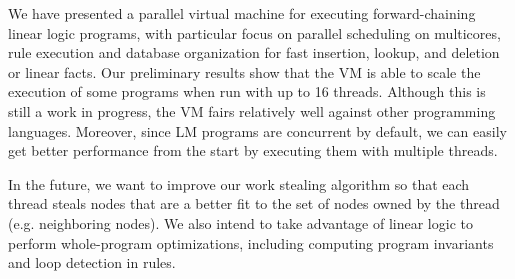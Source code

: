 We have presented a parallel virtual machine for executing forward-chaining linear logic programs, with particular focus
on parallel scheduling on multicores, rule execution and database organization for fast insertion,
lookup, and deletion or linear facts.
Our preliminary results show that the VM is able to scale the execution of some programs when run with up to 16 threads.
Although this is still a work in progress, the VM fairs relatively well against other programming languages.
Moreover, since LM programs are concurrent by default, we can easily get better performance from the start by executing
them with multiple threads.

In the future, we want to improve our work stealing algorithm so that each thread steals nodes that are a better fit
to the set of nodes owned by the thread (e.g. neighboring nodes).
We also intend to take advantage of linear logic to perform whole-program optimizations,
including computing program invariants and loop detection in rules.